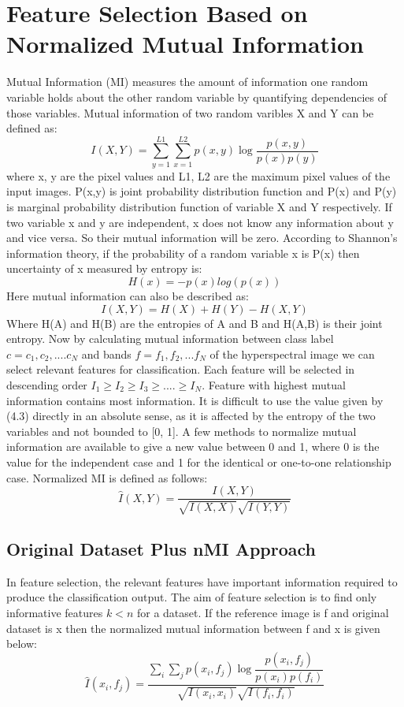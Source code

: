 \documentclass[document.tex]{subfiles}
\begin{document}
\section{Feature Selection Based on Normalized Mutual Information}
\noindent Mutual Information (MI) measures the amount of information one random variable holds about the other random variable by quantifying dependencies of those variables. Mutual information of two random varibles X and Y can be defined as:
\begin{equation}
I(X,Y) = \sum_{y=1}^{L1}\sum_{x=1}^{L2}p(x,y)\log\dfrac{p(x,y)}{p(x)p(y)}
\end{equation}
where x, y are the pixel values and L1, L2 are the maximum
pixel values of the input images. P(x,y) is joint probability distribution function and P(x) and P(y) is marginal probability distribution function of variable X and Y respectively. If two variable x and
y are independent, x does not know any information about y and vice versa. So their
mutual information will be zero. According to Shannon’s information theory, if the
probability of a random variable x is P(x) then uncertainty of x measured by entropy is:
\begin{equation}
H(x) = -p(x)log(p(x))
\end{equation}
Here mutual information can also be described as:
\begin{equation}
I(X,Y) = H(X) + H(Y) - H(X,Y)
\end{equation}
Where H(A) and H(B) are the entropies of A and B and H(A,B)
is their joint entropy. Now by calculating mutual information between class label $c = c_1,c_2,....c_N$ and bands $f = f_1,f_2,...f_N$ of the hyperspectral image we can select relevant features for classification. Each feature will be selected in descending order $I_1 \geq I_2 \geq I_3 \geq....\geq I_N$. Feature with highest mutual information contains most information. It is difficult to use the value given by (4.3) directly in an absolute sense, as it is affected by the entropy of the two variables and not bounded to [0, 1]. A few methods to normalize mutual information are available to give a new value between 0 and 1, where 0 is the value for the independent case and 1 for the identical or one-to-one relationship case. Normalized MI is defined as follows:
\begin{equation}
\hat{I}(X,Y) = \dfrac{I(X,Y)}{\sqrt{I(X,X)}\sqrt{I(Y,Y)}}
\end{equation}
\subsection{Original Dataset Plus nMI Approach}
\noindent In feature selection, the relevant features have important
information required to produce the classification output. The aim of feature selection is to find only informative features $k < n$ for a dataset. If the reference image is f and original dataset is x then the normalized mutual information between f and x is given below:
\begin{equation}
\hat{I}(x_i,f_j) = \dfrac{\sum_{i}\sum_{j} p(x_i,f_j)\log\dfrac{p(x_i,f_j)}{p(x_i)p(f_i)}}{\sqrt{I(x_i,x_i)}\sqrt{I(f_i,f_i)}}
\end{equation}  
\end{document}
